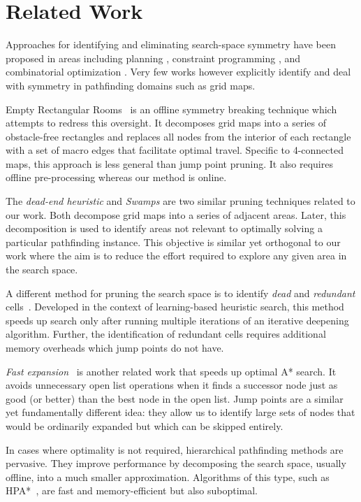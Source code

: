 \section{Related Work}
\label{sec:relatedwork}
 Approaches for identifying and eliminating search-space symmetry have been
proposed in areas including planning \cite{fox99}, constraint programming
\cite{gent00}, and combinatorial optimization \cite{fukunaga08}. 
Very few works however explicitly identify and deal with symmetry in pathfinding
domains such as grid maps. 

Empty Rectangular Rooms~\cite{harabor10} is an offline symmetry breaking technique
which attempts to redress this oversight. 
It decomposes grid maps into a series of obstacle-free rectangles and replaces all nodes 
from the interior of each rectangle with 
a set of macro edges that facilitate optimal travel. 
Specific to 4-connected maps, this approach is less general than
jump point pruning. It also requires offline pre-processing whereas our
method is online.

The \emph{dead-end heuristic} \cite{bjornsson06} and \emph{Swamps} \cite{pochter10}
are two similar pruning techniques related to our work.
Both decompose grid maps into a series of adjacent areas. Later, this decomposition
is used to identify areas not relevant to optimally solving a particular
pathfinding instance.
This objective is similar yet orthogonal to our work where
the aim is to reduce the effort required to explore any given area in the search
space.

A different method for pruning the search space is to identify \emph{dead} and
\emph{redundant} cells~\cite{sturtevant10b}.  Developed in the context of
learning-based heuristic search, this method speeds up search only after running
multiple iterations of an iterative deepening algorithm.  Further, the
identification of redundant cells requires additional memory overheads which
jump points do not have.

\emph{Fast expansion}~\cite{sun09} is another related work that speeds up
optimal A* search. It avoids unnecessary open list operations when it finds a
successor node just as good (or better) than the best node in the open list.
Jump points are a similar yet fundamentally different idea: they allow us to
identify large sets of nodes that would be ordinarily expanded but which can be
skipped entirely.
 
In cases where optimality is not required, hierarchical pathfinding methods
are pervasive.  They improve performance by decomposing the
search space, usually offline, into a much smaller approximation.  Algorithms
of this type, such as HPA*~\cite{botea04}, are  fast and
memory-efficient but also suboptimal.

